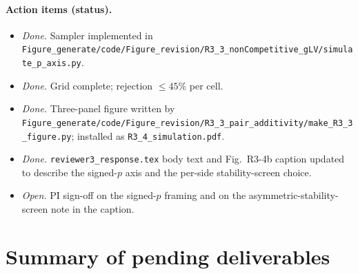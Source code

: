 \documentclass[11pt]{article}
\begin{document}
\paragraph{Action items (status).}
\begin{itemize}[itemsep=0pt]
  \item[\textbf{A1.}] \emph{Done.} Sampler implemented in \texttt{Figure\_generate/code/Figure\_revision/R3\_3\_nonCompetitive\_gLV/simulate\_p\_axis.py}.
  \item[\textbf{A2.}] \emph{Done.} Grid complete; rejection $\leq 45\%$ per cell.
  \item[\textbf{A3.}] \emph{Done.} Three-panel figure written by \texttt{Figure\_generate/code/Figure\_revision/R3\_3\_pair\_additivity/make\_R3\_3\_figure.py}; installed as \texttt{R3\_4\_simulation.pdf}.
  \item[\textbf{A4.}] \emph{Done.} \texttt{reviewer3\_response.tex} body text and Fig.~R3-4b caption updated to describe the signed-$p$ axis and the per-side stability-screen choice.
  \item[\textbf{A5.}] \emph{Open.} PI sign-off on the signed-$p$ framing and on the asymmetric-stability-screen note in the caption.
\end{itemize}

\section*{Summary of pending deliverables}
\end{document}
